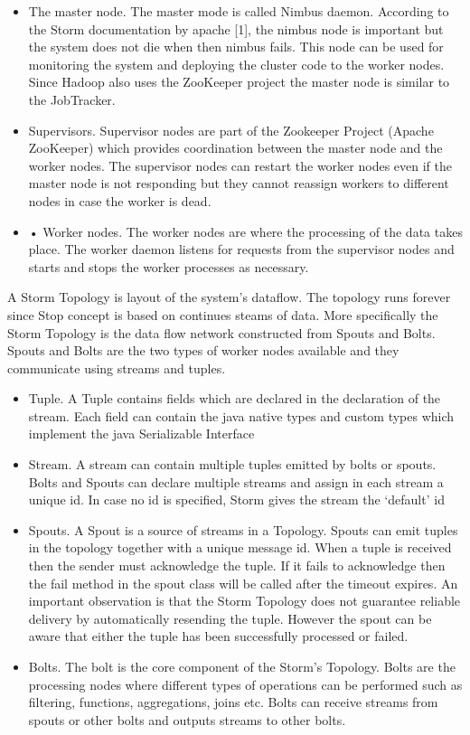 \documentclass{lmproj}
\begin{document}
\begin{itemize}
	\item The master node. The master mode is called Nimbus daemon. According to the Storm documentation by apache [1], the nimbus node is important but the system does not die when then nimbus fails. This node can be used for monitoring the system and deploying the cluster code to the worker nodes. Since Hadoop also uses the ZooKeeper project the master node is similar to the JobTracker.
	\item Supervisors. Supervisor nodes are part of the Zookeeper Project (Apache ZooKeeper) which provides coordination between the master node and the worker nodes. The supervisor nodes can restart the worker nodes even if the master node is not responding but they cannot reassign workers to different nodes in case the worker is dead.
	\item •	Worker nodes. The worker nodes are where the processing of the data takes place. The worker daemon listens for requests from the supervisor nodes and starts and stops the worker processes as necessary.
	
\end{itemize}

A Storm Topology is layout of the system’s dataflow. The topology runs forever since Stop concept is based on continues steams of data.  More specifically the Storm Topology is the data flow network constructed from Spouts and Bolts. Spouts and Bolts are the two types of worker nodes available and they communicate using streams and tuples. 

\begin{itemize}
	\item Tuple. A  Tuple contains fields which are declared in the declaration of the stream. Each field can contain the java native types and custom types which implement the java Serializable Interface
	\item Stream. A stream can contain multiple tuples emitted by bolts or spouts. Bolts and Spouts can declare multiple streams and assign in each stream a unique id. In case no id is specified, Storm gives the stream the ‘default’  id 
	\item Spouts. A Spout is a source of streams in a Topology. Spouts can emit tuples in the topology together with a unique message id. When a tuple is received then the sender must acknowledge the tuple. If it fails to acknowledge then the fail method in the spout class will be called after the timeout expires. An important observation is that the Storm Topology does not guarantee reliable delivery by automatically resending the tuple. However the spout can be aware that either the tuple has been successfully processed or failed.
	\item Bolts. The bolt is the core component of the Storm’s Topology. Bolts are the processing nodes where different types of operations can be performed such as filtering, functions, aggregations, joins etc. Bolts can receive streams from spouts or other bolts and outputs streams to other bolts.
\end{itemize}
\end{document}

